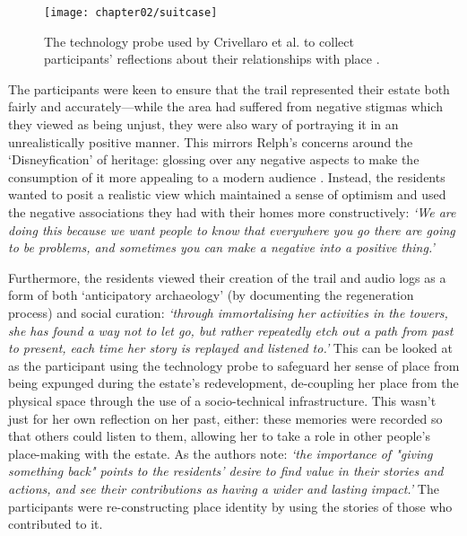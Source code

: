 \begin{figure}
\texttt{[image: chapter02/suitcase]}
\caption[Crivellaro et al.'s technology probe]{The technology probe used by Crivellaro et al. to collect participants' reflections about their relationships with place \citep{Crivellaro2016}.}
\label{fig:suitcase} \end{figure}

The participants were keen to ensure that the trail represented their estate both fairly and accurately---while the area had suffered from negative stigmas which they viewed as being unjust, they were also wary of portraying it in an unrealistically positive manner. This mirrors Relph's concerns around the `Disneyfication' of heritage: glossing over any negative aspects to make the consumption of it more appealing to a modern audience \citep{Relph2018}. Instead, the residents wanted to posit a realistic view which maintained a sense of optimism and used the negative associations they had with their homes more constructively: \textit{`We are doing this because we want people to know that everywhere you go there are going to be problems, and sometimes you can make a negative into a positive thing.'}

Furthermore, the residents viewed their creation of the trail and audio logs as a form of both `anticipatory archaeology' (by documenting the regeneration process) and social curation: \textit{`through immortalising her activities in the towers, she has found a way not to let go, but rather repeatedly etch out a path from past to present, each time her story is replayed and listened to.'} This can be looked at as the participant using the technology probe to safeguard her sense of place from being expunged during the estate's redevelopment, de-coupling her place from the physical space through the use of a socio-technical infrastructure. This wasn't just for her own reflection on her past, either: these memories were recorded so that others could listen to them, allowing her to take a role in other people's place-making with the estate. As the authors note: \textit{`the importance of "giving something back" points to the residents' desire to find value in their stories and actions, and see their contributions as having a wider and lasting impact.'} The participants were re-constructing place identity by using the stories of those who contributed to it.

